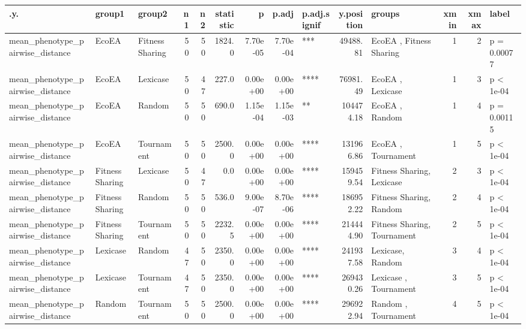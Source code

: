 \documentclass[]{book}
\begin{document}
\begin{table}
\centering
\begin{tabular}[t]{l|l|l|r|r|r|r|r|l|r|l|r|r|l}
\hline
.y. & group1 & group2 & n1 & n2 & statistic & p & p.adj & p.adj.signif & y.position & groups & xmin & xmax & label\\
\hline
mean\_phenotype\_pairwise\_distance & EcoEA & Fitness Sharing & 50 & 50 & 1824.0 & 7.70e-05 & 7.70e-04 & *** & 49488.81 & EcoEA          , Fitness Sharing & 1 & 2 & p = 0.00077\\
\hline
mean\_phenotype\_pairwise\_distance & EcoEA & Lexicase & 50 & 47 & 227.0 & 0.00e+00 & 0.00e+00 & **** & 76981.49 & EcoEA   , Lexicase & 1 & 3 & p < 1e-04\\
\hline
mean\_phenotype\_pairwise\_distance & EcoEA & Random & 50 & 50 & 690.0 & 1.15e-04 & 1.15e-03 & ** & 104474.18 & EcoEA , Random & 1 & 4 & p = 0.00115\\
\hline
mean\_phenotype\_pairwise\_distance & EcoEA & Tournament & 50 & 50 & 2500.0 & 0.00e+00 & 0.00e+00 & **** & 131966.86 & EcoEA     , Tournament & 1 & 5 & p < 1e-04\\
\hline
mean\_phenotype\_pairwise\_distance & Fitness Sharing & Lexicase & 50 & 47 & 0.0 & 0.00e+00 & 0.00e+00 & **** & 159459.54 & Fitness Sharing, Lexicase & 2 & 3 & p < 1e-04\\
\hline
mean\_phenotype\_pairwise\_distance & Fitness Sharing & Random & 50 & 50 & 536.0 & 9.00e-07 & 8.70e-06 & **** & 186952.22 & Fitness Sharing, Random & 2 & 4 & p < 1e-04\\
\hline
mean\_phenotype\_pairwise\_distance & Fitness Sharing & Tournament & 50 & 50 & 2232.5 & 0.00e+00 & 0.00e+00 & **** & 214444.90 & Fitness Sharing, Tournament & 2 & 5 & p < 1e-04\\
\hline
mean\_phenotype\_pairwise\_distance & Lexicase & Random & 47 & 50 & 2350.0 & 0.00e+00 & 0.00e+00 & **** & 241937.58 & Lexicase, Random & 3 & 4 & p < 1e-04\\
\hline
mean\_phenotype\_pairwise\_distance & Lexicase & Tournament & 47 & 50 & 2350.0 & 0.00e+00 & 0.00e+00 & **** & 269430.26 & Lexicase  , Tournament & 3 & 5 & p < 1e-04\\
\hline
mean\_phenotype\_pairwise\_distance & Random & Tournament & 50 & 50 & 2500.0 & 0.00e+00 & 0.00e+00 & **** & 296922.94 & Random    , Tournament & 4 & 5 & p < 1e-04\\
\hline
\end{tabular}
\end{table}
\end{document}
